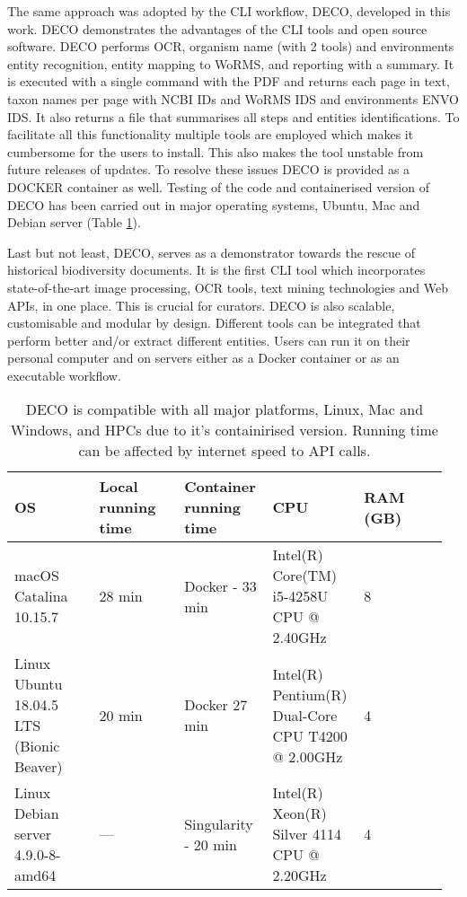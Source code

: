 The same approach was adopted by the CLI workflow, DECO, developed in this work.
DECO demonstrates the advantages of the CLI tools and open source software.
DECO performs OCR, organism name (with 2 tools) and environments entity recognition, entity mapping 
to WoRMS, and reporting with a summary. It is executed with a single command with 
the PDF and returns each page in text, taxon names per page with NCBI IDs and WoRMS IDS and environments
ENVO IDS. It also returns a file that summarises all steps and entities identifications.
To facilitate all this functionality multiple tools are employed which makes it 
cumbersome for the users to install. This also makes the tool unstable from 
future releases of updates. To resolve these issues DECO is provided as 
a DOCKER container as well. Testing of the code and containerised version of DECO
has been carried out in major operating systems, Ubuntu, Mac and Debian server (Table \ref{table-CLI}).

Last but not least, DECO, serves as a demonstrator towards the rescue of historical biodiversity documents.
It is the first CLI tool which incorporates state-of-the-art image processing, OCR tools, text mining
technologies and Web APIs, in one place. This is crucial for curators.
DECO is also scalable, customisable and modular by design.
Different tools can be integrated that perform better and/or extract different entities. 
Users can run it on their personal computer and on servers either as a Docker container or as an executable workflow.

\begin{table}[ht]
    \begin{tabular}{p{0.192\linewidth}p{0.192\linewidth}p{0.192\linewidth}p{0.192\linewidth}p{0.192\linewidth}}
\hline
\textbf{OS} & \textbf{Local running time} & \textbf{Container running time} & \textbf{CPU} & \textbf{RAM (GB)} \\
\hline
macOS Catalina 10.15.7 & 28 min & Docker - 33 min & Intel(R) Core(TM) i5-4258U CPU @ 2.40GHz & 8 \\
Linux Ubuntu 18.04.5 LTS (Bionic Beaver) & 20 min & Docker  27 min & Intel(R) Pentium(R) Dual-Core CPU T4200 @ 2.00GHz & 4 \\
Linux Debian server 4.9.0-8-amd64 & --- & Singularity - 20 min & Intel(R) Xeon(R) Silver 4114 CPU @ 2.20GHz & 4
\end{tabular}%
\caption{DECO is compatible with all major platforms, Linux, Mac and Windows, and HPCs due to it's containirised version.
Running time can be affected by internet speed to API calls.}
\label{table-CLI}
\end{table}

